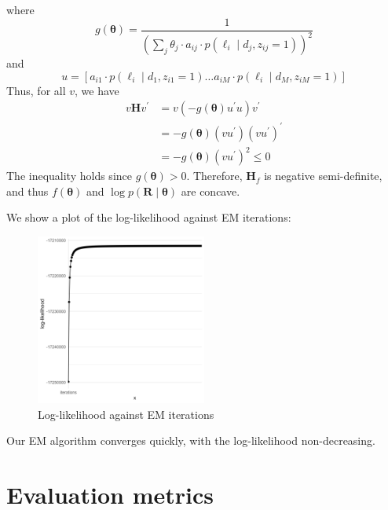 where 
\begin{equation}
    g(\boldsymbol{\theta})=\frac{1}{\left(\sum_{j} \theta_{j} \cdot a_{i j} \cdot p\left(\ell_{i} \mid d_{j}, z_{i j}=1\right)\right)^{2}}
\end{equation}
and 
\begin{equation}
    u=\left[a_{i 1} \cdot p\left(\ell_{i} \mid d_{1}, z_{i 1}=1\right) \ldots a_{i M} \cdot p\left(\ell_{i} \mid d_{M}, z_{i M}=1\right)\right]
\end{equation}
Thus, for all $v$, we have 
\begin{equation}
    \begin{split}
        v \mathbf{H} v^{\prime} &=v\left(-g(\boldsymbol{\theta}) u^{\prime} u\right) v^{\prime} \\
        &=-g(\boldsymbol{\theta})\left(v u^{\prime}\right)\left(v u^{\prime}\right)^{\prime} \\
        &=-g(\boldsymbol{\theta})\left(v u^{\prime}\right)^{2} \leq 0
    \end{split}
\end{equation}
The inequality holds since $g(\bm\theta)>0$. Therefore, $\mathrm{\mathbf{H}}_f$ is negative semi-definite, and thus $f(\bm\theta)$ and $\log p(\bm{R}\mid\bm\theta)$ are concave.  

We show a plot of the log-likelihood against EM iterations:

\begin{figure}[H]
    \centering
    \includegraphics[width=0.5\textwidth]{figures/ll.png}
    \caption[Log-likelihood against EM iterations]{Log-likelihood against EM iterations}
    \label{fig:ll}
\end{figure}

Our EM algorithm converges quickly, with the log-likelihood non-decreasing.

\chapter{Evaluation metrics}\label{ap:eval-metrics}

